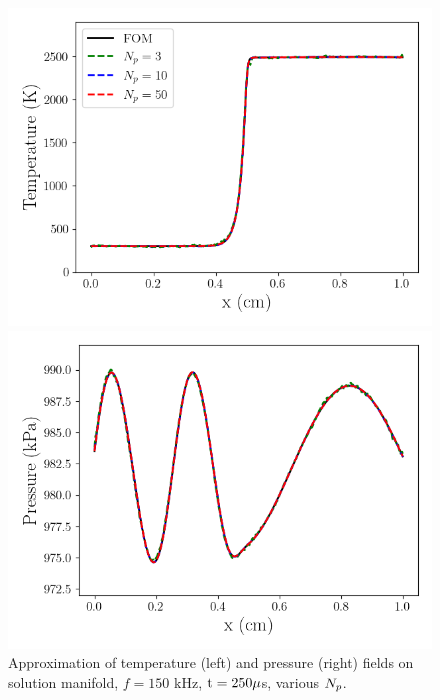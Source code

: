 \begin{figure}
    \begin{minipage}{0.49\linewidth}
        \includegraphics[width=0.99\linewidth]{Chapters/TransientFlame/Images/nonlinear/proj_temp_snaps.png}
    \end{minipage}
    \begin{minipage}{0.49\linewidth}
        \includegraphics[width=0.99\linewidth]{Chapters/TransientFlame/Images/nonlinear/proj_press_snaps.png}
    \end{minipage}
    \caption{Approximation of temperature (left) and pressure (right) fields on solution manifold, $f = 150$ kHz, $\text{t} = 250 \mu$s, various $N_p$.}
\end{figure}

